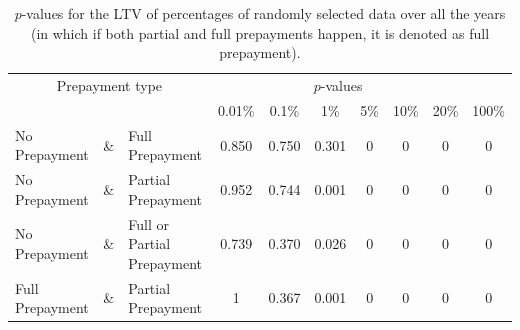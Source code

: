         \begin{table}[H]
        \centering
            \begin{tabular}{lcl|c|c|c|c|c|c|c}
                \multicolumn{3}{c|}{Prepayment type} 
                & \multicolumn{6}{c}{$p$-values}& \\
                &&&0.01\%&0.1\%&1\%&5\%&10\%&20\%&100\%\\\hline
                No Prepayment & \& & Full Prepayment & 0.850 & 0.750&0.301&0&0&0&0\\
                No Prepayment & \& & Partial Prepayment & 0.952 & 0.744&0.001&0&0&0&0\\
                No Prepayment & \& & Full or Partial Prepayment & 0.739 & 0.370&0.026&0&0&0&0 \\
                Full Prepayment & \& & Partial Prepayment & 1 & 0.367&0.001&0&0&0&0
		    \end{tabular}
            \caption{
                $p$-values for the LTV of percentages of randomly selected data over all the years (in which if both partial and full 
                prepayments happen, it is denoted as full prepayment).
                }
	        \label{model_Pvals_of_LTV}
        \end{table}
    
